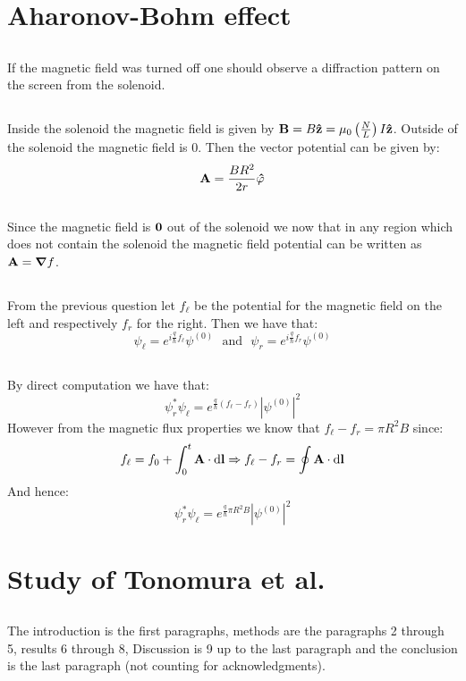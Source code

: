 \documentclass[10pt,a4paper]{book}
\begin{document}
\section{Aharonov-Bohm effect}
\subsection{}
If the magnetic field was turned off one should observe a diffraction pattern on the screen from the solenoid.

\subsection{}
Inside the solenoid the magnetic field is given by $\vb{B} = B\vu{z} = \mu_0\left(\frac{N}{L}\right)I \vu{z}$. Outside of the solenoid the magnetic field is 0. Then the vector potential can be given by:
\[
\vb{A} = \frac{B R^2}{2 r} \vu{\varphi}
\] 

\subsection{}
Since the magnetic field is $\vb{0}$ out of the solenoid we now that in any region which does not contain the solenoid the magnetic field potential can be written as $\vb{A} = \grad f$. 

\subsection{}
From the previous question let $f_\ell$ be the potential for the magnetic field on the left and respectively $f_r$ for the right. Then we have that:
\[
\psi_\ell = e^{i\frac{q}{\hbar} f_\ell} \psi^{(0)} \mbox{~~and~~} \psi_r = e^{i\frac{q}{\hbar} f_r} \psi^{(0)}
\]

\subsection{}
By direct computation we have that:
\[
\psi_r^* \psi_\ell = e^{\frac{q}{\hbar}(f_\ell - f_r)} |\psi^{(0)}|^2
\]
However from the magnetic flux properties we know that $f_\ell - f_r = \pi R^2 B$ since: 
\[
f_\ell = f_0 + \int_0^t \vb{A} \cdot \dd \vb{l} \Rightarrow f_\ell - f_r = \oint \vb{A} \cdot \dd \vb{l}
\]
And hence:
\[
\psi_r^* \psi_\ell = e^{\frac{q}{\hbar}\pi R^2 B} |\psi^{(0)}|^2
\]

\section{Study of Tonomura et al.}
\subsection{}
The introduction is the first paragraphs, methods are the paragraphs 2 through 5, results 6 through 8, Discussion is 9 up to the last paragraph and the conclusion is the last paragraph (not counting for acknowledgments).

\subsection{}
\end{document}
